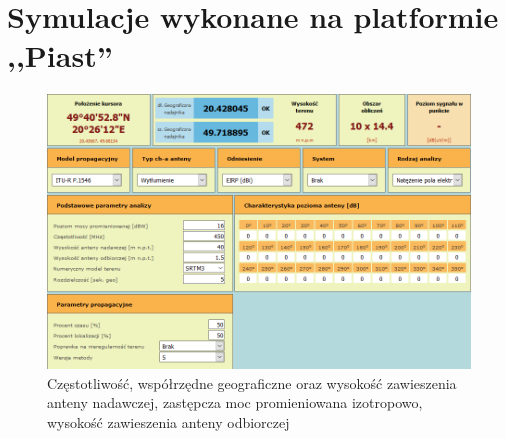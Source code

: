 \documentclass[12pt, a4paper, oneside]{article}
\begin{document}
\section{Symulacje wykonane na platformie ,,Piast''}
\begin{figure}[h!]
\centering
\includegraphics[scale=0.5]{pics/piast/f1.png}
\caption{Częstotliwość, współrzędne geograficzne oraz wysokość zawieszenia anteny nadawczej, zastępcza moc promieniowana izotropowo, wysokość zawieszenia anteny odbiorczej}
\end{figure}
\clearpage
\end{document}
